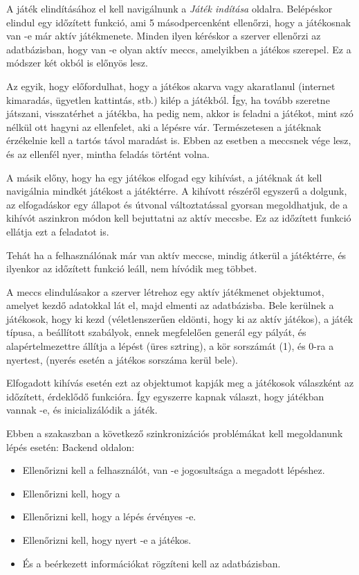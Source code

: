 A játék elindításához el kell navigálnunk a \textit{Játék indítása} oldalra. Belépéskor elindul egy időzített funkció, ami 5 másodpercenként ellenőrzi, hogy a játékosnak van -e már aktív játékmenete. Minden ilyen kéréskor a szerver ellenőrzi az adatbázisban, hogy van -e olyan aktív meccs, amelyikben a játékos szerepel. Ez a módszer két okból is előnyös lesz.

Az egyik, hogy előfordulhat, hogy a játékos akarva vagy akaratlanul (internet kimaradás, ügyetlen kattintás, stb.) kilép a játékból. Így, ha tovább szeretne játszani, visszatérhet a játékba, ha pedig nem, akkor is feladni a játékot, mint szó nélkül ott hagyni az ellenfelet, aki a lépésre vár. Természetesen a játéknak érzékelnie kell a tartós távol maradást is. Ebben az esetben a meccsnek vége lesz, és az ellenfél nyer, mintha feladás történt volna.

A másik előny, hogy ha egy játékos elfogad egy kihívást, a játéknak át kell navigálnia mindkét játékost a játéktérre. A kihívott részéről egyszerű a dolgunk, az elfogadáskor egy állapot és útvonal változtatással gyorsan megoldhatjuk, de a kihívót aszinkron módon kell bejuttatni az aktív meccsbe. Ez az időzített funkció ellátja ezt a feladatot is.

Tehát ha a felhasználónak már van aktív meccse, mindig átkerül a játéktérre, és ilyenkor az időzített funkció leáll, nem hívódik meg többet.

A meccs elindulásakor a szerver létrehoz egy aktív játékmenet objektumot, amelyet kezdő adatokkal lát el, majd elmenti az adatbázisba. Bele kerülnek a játékosok, hogy ki kezd (véletlenszerűen eldönti, hogy ki az aktív játékos), a játék típusa, a beállított szabályok, ennek megfelelően generál egy pályát, és alapértelmezettre állítja a lépést (üres sztring), a kör sorszámát (1), és 0-ra a nyertest, (nyerés esetén a játékos sorszáma kerül bele).

Elfogadott kihívás esetén ezt az objektumot kapják meg a játékosok válaszként az időzített, érdeklődő funkcióra. Így egyszerre kapnak választ, hogy játékban vannak -e, és inicializálódik a játék.

Ebben a szakaszban a következő szinkronizációs problémákat kell megoldanunk lépés esetén:
Backend oldalon:
\begin{itemize}
	\item Ellenőrizni kell a felhasználót, van -e jogosultsága a megadott lépéshez.
	\item Ellenőrizni kell, hogy a
	\item Ellenőrizni kell, hogy a lépés érvényes -e.
	\item Ellenőrizni kell, hogy nyert -e a játékos.
	\item És a beérkezett információkat rögzíteni kell az adatbázisban.
\end{itemize}

